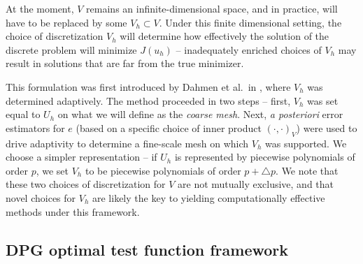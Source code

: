 \documentclass[final,leqno]{siamltex}
\newcommand{\LRp}[1]{\left( #1 \right)}
\begin{document}
At the moment, $V$ remains an infinite-dimensional space, and in practice, will have to be replaced by some $V_h\subset V$.  Under this finite dimensional setting, the choice of discretization $V_h$ will determine how effectively the solution of the discrete problem will minimize $J(u_h)$ -- inadequately enriched choices of $V_h$ may result in solutions that are far from the true minimizer.  


This formulation was first introduced by Dahmen et al.\ in \cite{DahmenVariationalStabilization}, where $V_h$ was determined adaptively.  The method proceeded in two steps -- first, $V_h$ was set equal to $U_h$ on what we will define as the \textit{coarse mesh}.  Next, \textit{a posteriori} error estimators for $e$ (based on a specific choice of inner product $\LRp{\cdot,\cdot}_V$) were used to drive adaptivity to determine a fine-scale mesh on which $V_h$ was supported.  We choose a simpler representation -- if $U_h$ is represented by piecewise polynomials of order $p$, we set $V_h$ to be piecewise polynomials of order $p+\triangle p$.  We note that these two choices of discretization for $V$ are not mutually exclusive, and that novel choices for $V_h$ are likely the key to yielding computationally effective methods under this framework.  
\subsection{DPG optimal test function framework}
\end{document}
